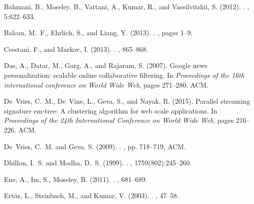\documentclass[10pt]{article}
\begin{document}
\newpage

% 
\begin{thebibliography}{}

Bahmani, B., Moseley, B., Vattani, A., Kumar, R., and Vassilvitskii, S. (2012).
.
, 5:622--633.

Balcan, M.~F., Ehrlich, S., and Liang, Y. (2013).
.
, pages 1--9.

Crestani, F., and Markov, I. (2013).
.
, 865--868.

Das, A., Datar, M., Garg, A., and Rajaram, S. (2007).
\newblock Google news personalization: scalable online collaborative filtering.
\newblock In {\em Proceedings of the 16th international conference on World
  Wide Web}, pages 271--280. ACM.

De~Vries, C.~M., De~Vine, L., Geva, S., and Nayak, R. (2015).
\newblock Parallel streaming signature em-tree: A clustering algorithm for web
  scale applications.
\newblock In {\em Proceedings of the 24th International Conference on World
  Wide Web}, pages 216--226. ACM.


De~Vries, C.~M. and Geva, S. (2009).
.
, pp. 718--719, ACM.

Dhillon, I.~S. and Modha, D.~S. (1999).
.
, 1759(802):245--260.

Ene, A., Im, S., Moseley, B. (2011).
.
, 681--689.

Ert{\"o}z, L., Steinbach, M., and Kumar, V. (2003).
.
, 47--58.


\end{thebibliography}
\end{document}
